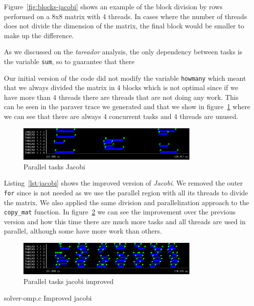 Figure~\ref{fig:blocks-jacobi} shows an example of the block division by rows performed on a 8x8 matrix
with 4 threads. In cases where the number of threads does not divide the dimension of the matrix, the final
block would be smaller to make up the difference.

As we discussed on the \emph{tareador} analysis, the only dependency between tasks is the variable
\texttt{sum}, so to guarantee that there 

Our initial version of the code did not modify the variable \texttt{howmany} which meant that we always
divided the matrix in 4 blocks which is not optimal since if we have more than 4 threads there are threads
that are not doing any work. This can be seen in the paraver trace we generated and that we show in
figure~\ref{fig:trace-jacobi0} where we can see that there are always 4 concurrent tasks and 4 threads are unused.

\begin{figure}[H]
    \centering
    \includegraphics[width=0.8\textwidth]{jacobi_0_tasks}
    \caption{Parallel tasks Jacobi}%
    \label{fig:trace-jacobi0}
\end{figure}

Listing~\ref{lst:jacobi} shows the improved version of \emph{Jacobi}. We removed the outer \texttt{for}
since is not needed as we use the parallel region with all its threads to divide the matrix. We also
applied the same division and parallelization approach to the \texttt{copy\_mat} function.
In figure~\ref{fig:trace-jacobi1} we can see the improvement over the previous version and how this time
there are much more tasks and all threads are used in parallel, although some have more work than others.

\begin{figure}[H]
    \centering
    \includegraphics[width=0.8\textwidth]{jacobi_1_tasks}
    \caption{Parallel tasks jacobi improved}%
    \label{fig:trace-jacobi1}
\end{figure}

\begin{listing}[H]
    \caption{solver-omp.c Improved jacobi}%
    \label{lst:jacobi}
    \inputminted[firstline=8,lastline=19]{c}{code/solver-omp.c}
    \vspace{-2.5em}
    \inputminted[firstline=25,lastline=52]{c}{code/solver-omp.c}
\end{listing}

